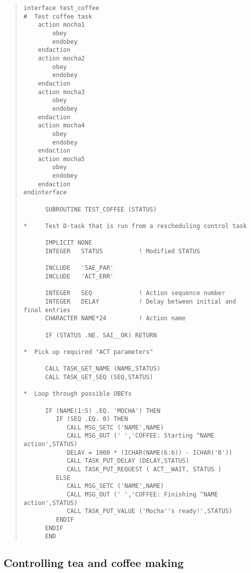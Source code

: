 \documentclass[twoside,11pt]{article}
\renewcommand{\_}{\texttt{\symbol{95}}}
\begin{document}
\small \begin{quote} \begin{verbatim}
interface test_coffee
#  Test coffee task
    action mocha1
        obey
        endobey
    endaction
    action mocha2
        obey
        endobey
    endaction
    action mocha3
        obey
        endobey
    endaction
    action mocha4
        obey
        endobey
    endaction
    action mocha5
        obey
        endobey
    endaction
endinterface

      SUBROUTINE TEST_COFFEE (STATUS)

*     Test D-task that is run from a rescheduling control task

      IMPLICIT NONE
      INTEGER   STATUS          ! Modified STATUS
 
      INCLUDE   'SAE_PAR'
      INCLUDE   'ACT_ERR'
 
      INTEGER   SEQ             ! Action sequence number
      INTEGER   DELAY           ! Delay between initial and final entries
      CHARACTER NAME*24         ! Action name
 
      IF (STATUS .NE. SAI__OK) RETURN

*  Pick up required "ACT parameters"

      CALL TASK_GET_NAME (NAME,STATUS)
      CALL TASK_GET_SEQ (SEQ,STATUS)

*  Loop through possible OBEYs
 
      IF (NAME(1:5) .EQ. 'MOCHA') THEN
         IF (SEQ .EQ. 0) THEN
            CALL MSG_SETC ('NAME',NAME)
            CALL MSG_OUT (' ','COFFEE: Starting ^NAME action',STATUS)
            DELAY = 1000 * (ICHAR(NAME(6:6)) - ICHAR('0'))
            CALL TASK_PUT_DELAY (DELAY,STATUS)
            CALL TASK_PUT_REQUEST ( ACT__WAIT, STATUS )
         ELSE
            CALL MSG_SETC ('NAME',NAME)
            CALL MSG_OUT (' ','COFFEE: Finishing ^NAME action',STATUS)
            CALL TASK_PUT_VALUE ('Mocha''s ready!',STATUS)
         ENDIF
      ENDIF
      END

\end{verbatim} \end{quote} \normalsize

\subsection{Controlling tea and coffee making}
\end{document}
